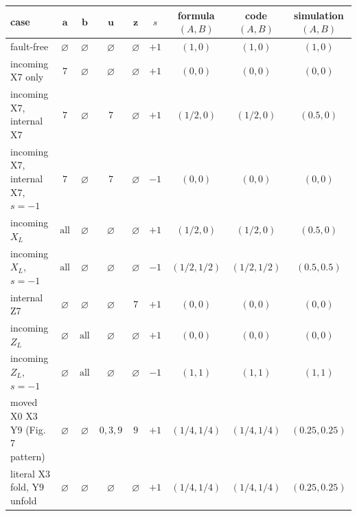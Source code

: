 \begin{tabular}{lcccccccc}\toprule
case & $\boldsymbol a$ & $\boldsymbol b$ & $\boldsymbol u$ & $\boldsymbol z$ & $s$ & formula $(A,B)$ & code $(A,B)$ & simulation $(A,B)$ \\\midrule
fault-free & $\varnothing$ & $\varnothing$ & $\varnothing$ & $\varnothing$ & $+1$ & $(1,0)$ & $(1,0)$ & $(1,0)$ \\
incoming X7 only & $7$ & $\varnothing$ & $\varnothing$ & $\varnothing$ & $+1$ & $(0,0)$ & $(0,0)$ & $(0,0)$ \\
incoming X7, internal X7 & $7$ & $\varnothing$ & $7$ & $\varnothing$ & $+1$ & $(1/2,0)$ & $(1/2,0)$ & $(0.5,0)$ \\
incoming X7, internal X7, $s=-1$ & $7$ & $\varnothing$ & $7$ & $\varnothing$ & $-1$ & $(0,0)$ & $(0,0)$ & $(0,0)$ \\
incoming $X_L$ & $\text{all}$ & $\varnothing$ & $\varnothing$ & $\varnothing$ & $+1$ & $(1/2,0)$ & $(1/2,0)$ & $(0.5,0)$ \\
incoming $X_L$, $s=-1$ & $\text{all}$ & $\varnothing$ & $\varnothing$ & $\varnothing$ & $-1$ & $(1/2,1/2)$ & $(1/2,1/2)$ & $(0.5,0.5)$ \\
internal Z7 & $\varnothing$ & $\varnothing$ & $\varnothing$ & $7$ & $+1$ & $(0,0)$ & $(0,0)$ & $(0,0)$ \\
incoming $Z_L$ & $\varnothing$ & $\text{all}$ & $\varnothing$ & $\varnothing$ & $+1$ & $(0,0)$ & $(0,0)$ & $(0,0)$ \\
incoming $Z_L$, $s=-1$ & $\varnothing$ & $\text{all}$ & $\varnothing$ & $\varnothing$ & $-1$ & $(1,1)$ & $(1,1)$ & $(1,1)$ \\
moved X0 X3 Y9 (Fig. 7 pattern) & $\varnothing$ & $\varnothing$ & $0,3,9$ & $9$ & $+1$ & $(1/4,1/4)$ & $(1/4,1/4)$ & $(0.25,0.25)$ \\
literal X3 fold, Y9 unfold & $\varnothing$ & $\varnothing$ & $\varnothing$ & $\varnothing$ & $+1$ & $(1/4,1/4)$ & $(1/4,1/4)$ & $(0.25,0.25)$ \\
\bottomrule\end{tabular}
